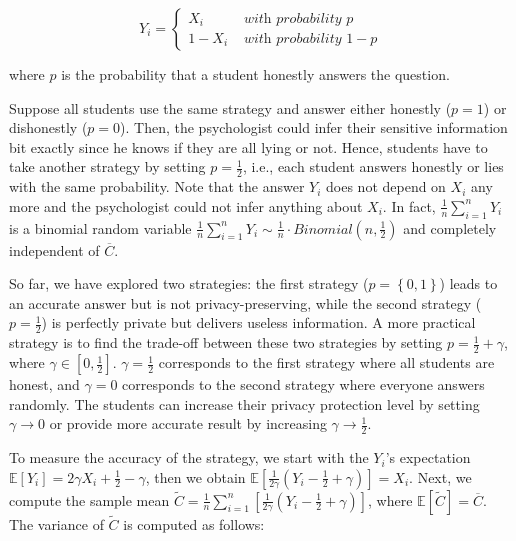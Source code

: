 \begin{equation}
    Y_{i}=
    \begin{cases}X_{i}   & \textit { with probability } p   \\
             1-X_{i} & \textit { with probability } 1-p
    \end{cases}
\end{equation}

where $p$ is the probability that a student honestly answers the question.

Suppose all students use the same strategy and answer either honestly ($p=1$) or dishonestly ($p=0$). Then, the psychologist could infer their sensitive information bit exactly since he knows if they are all lying or not. Hence, students have to take another strategy by setting $p=\frac{1}{2}$, i.e., each student answers honestly or lies with the same probability. Note that the answer $Y_{i}$ does not depend on $X_{i}$ any more and the psychologist could not infer anything about $X_{i}$. In fact, $\frac{1}{n}\sum ^{n}_{i=1}Y_{i}$  is a binomial random variable $\frac{1}{n}\sum ^{n}_{i=1}Y_{i} \sim \frac{1}{n} \cdot Binomial\left(n,\frac{1}{2}\right)$ and completely independent of $\overline{C}$.

So far, we have explored two strategies: the first strategy ($p=\left\{0,1\right\} $) leads to an accurate answer but is not privacy-preserving, while the second strategy ($p=\frac{1}{2}$) is perfectly private but delivers useless information. A more practical strategy is to find the trade-off between these two strategies by setting $p=\frac{1}{2}+\gamma$, where $\gamma \in \left[ 0 ,\frac{1}{2}\right] $. $\gamma=\frac{1}{2}$ corresponds to the first strategy where all students are honest, and $\gamma=0$ corresponds to the second strategy where everyone answers randomly. The students can increase their privacy protection level by setting $\gamma \to 0$ or provide more accurate result by increasing $\gamma \to \frac{1}{2}$.

To measure the accuracy of the strategy, we start with the $Y_{i}$’s expectation $\mathbb{E}\left[ Y_{i}\right] =2\gamma X_{i}+\frac{1}{2}-\gamma$, then we obtain $\mathbb{E} \left[ \frac{1}{2\gamma } \left(Y_{i}-\frac{1}{2}+\gamma \right) \right] =X_{i}$. Next, we compute the sample mean $\tilde{C}=\frac{1}{n}\sum ^{n}_{i=1}\left[ \frac{1}{2\gamma}\left( Y_{i}-\frac{1}{2}+\gamma \right) \right] $, where $\mathbb{E}\left[ \tilde{C}\right] =\overline{C}$. The variance of $\tilde{C}$ is computed as follows:

